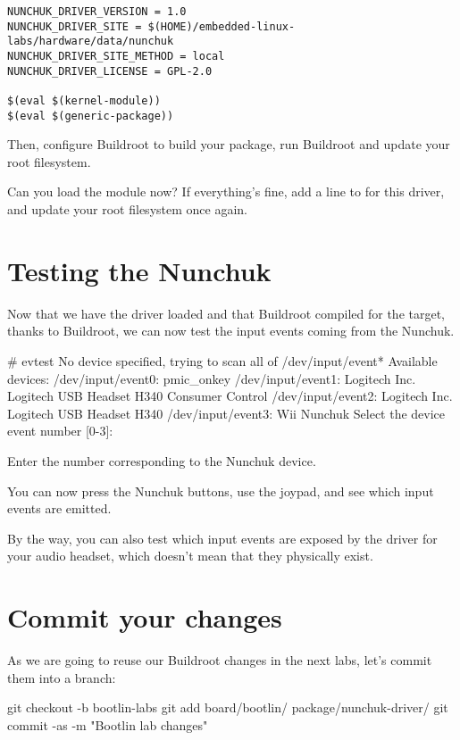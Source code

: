 \begin{verbatim}
NUNCHUK_DRIVER_VERSION = 1.0
NUNCHUK_DRIVER_SITE = $(HOME)/embedded-linux-labs/hardware/data/nunchuk
NUNCHUK_DRIVER_SITE_METHOD = local
NUNCHUK_DRIVER_LICENSE = GPL-2.0

$(eval $(kernel-module))
$(eval $(generic-package))
\end{verbatim}

Then, configure Buildroot to build your package, run Buildroot and
update your root filesystem.

Can you load the  module now? If everything's fine, add a
line to  for this driver, and update your
root filesystem once again.

\section{Testing the Nunchuk}

Now that we have the  driver loaded and that Buildroot compiled
 for the target, thanks to Buildroot, we can now test the input
events coming from the Nunchuk.

\begin{bashinput}
# evtest
No device specified, trying to scan all of /dev/input/event*
Available devices:
/dev/input/event0:	pmic_onkey
/dev/input/event1:	Logitech Inc. Logitech USB Headset H340 Consumer Control
/dev/input/event2:	Logitech Inc. Logitech USB Headset H340
/dev/input/event3:	Wii Nunchuk
Select the device event number [0-3]:
\end{bashinput}

Enter the number corresponding to the Nunchuk device.

You can now press the Nunchuk buttons, use the joypad, and see which
input events are emitted.

By the way, you can also test which input events are exposed by the
driver for your audio headset, which doesn't mean that they physically
exist.

\section{Commit your changes}

As we are going to reuse our Buildroot changes in the next labs,
let's commit them into a branch:

\begin{bashinput}
git checkout -b bootlin-labs
git add board/bootlin/ package/nunchuk-driver/
git commit -as -m "Bootlin lab changes"
\end{bashinput}

